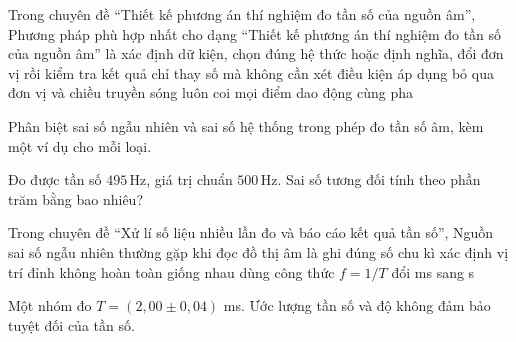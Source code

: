 \begin{ex}
Trong chuyên đề “Thiết kế phương án thí nghiệm đo tần số của nguồn âm”, Phương pháp phù hợp nhất cho dạng “Thiết kế phương án thí nghiệm đo tần số của nguồn âm” là
\choice
{\True xác định dữ kiện, chọn đúng hệ thức hoặc định nghĩa, đổi đơn vị rồi kiểm tra kết quả}
{chỉ thay số mà không cần xét điều kiện áp dụng}
{bỏ qua đơn vị và chiều truyền sóng}
{luôn coi mọi điểm dao động cùng pha}
\end{ex}

\begin{ex}
Phân biệt sai số ngẫu nhiên và sai số hệ thống trong phép đo tần số âm, kèm một ví dụ cho mỗi loại.
\choiceTF

\end{ex}

\begin{ex}
Đo được tần số $495\,\text{Hz}$, giá trị chuẩn $500\,\text{Hz}$. Sai số tương đối tính theo phần trăm bằng bao nhiêu?
\end{ex}

\begin{ex}
Trong chuyên đề “Xử lí số liệu nhiều lần đo và báo cáo kết quả tần số”, Nguồn sai số ngẫu nhiên thường gặp khi đọc đồ thị âm là
\choice
{ghi đúng số chu kì}
{\True xác định vị trí đỉnh không hoàn toàn giống nhau}
{dùng công thức $f=1/T$}
{đổi ms sang s}
\end{ex}

\begin{ex}
Một nhóm đo $T=(2,00\pm0,04)$ ms. Ước lượng tần số và độ không đảm bảo tuyệt đối của tần số.
\choiceTF

\end{ex}

